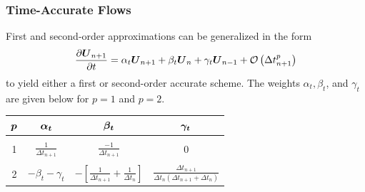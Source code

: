 \documentclass[compress,11pt]{beamer}
\begin{document}

\subsubsection{Time-Accurate Flows}
\frame
{
  
  First and second-order approximations can be generalized in the form
  \begin{equation}
    {\frac{\partial{{\boldsymbol{U}}_{n+1}}}{\partial{t}}} = \alpha_t {\boldsymbol{U}}_{n+1} + \beta_t {\boldsymbol{U}}_n + \gamma_t {\boldsymbol{U}}_{n-1} + \mathcal{O}\left(\Delta t_{n+1}^p\right)
    \label{eq:udot_thee_pt_backward}
  \end{equation}
  to yield either a first or second-order accurate scheme.  The weights $\alpha_t, \beta_t$, and $\gamma_t$ are given below for $p=1$ and $p=2$.

  \begin{center}
    \begin{tabular}{c||ccc}
      ${\boldsymbol{p}}$ & ${\boldsymbol{\alpha_t}}$ & ${\boldsymbol{\beta_t}}$ & ${\boldsymbol{\gamma_t}}$ \\ \hline\hline
          &          &         & \\
       1  & $\frac{1}{\Delta t_{n+1}}$ & $\frac{-1}{\Delta t_{n+1}}$ & 0 \\
          &          &         & \\
       2  & $-\beta_t - \gamma_t$ %
          & $-\left[\frac{1}{\Delta t_{n+1}} + \frac{1}{\Delta t_n}\right]$
          & $\frac{\Delta t_{n+1}}{\Delta t_n\left(\Delta t_{n+1} + \Delta t_n\right)}$ 
    \end{tabular}
  \end{center}
}
\end{document}
